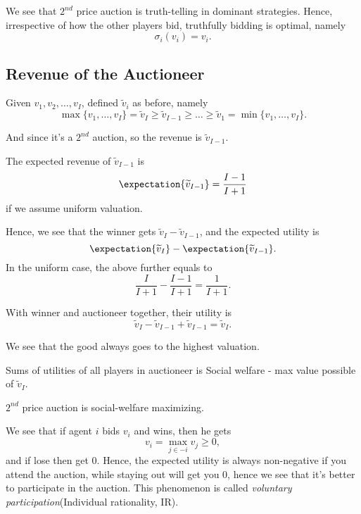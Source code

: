 \begin{remark}
	We see that \(2^{nd}\) price auction is truth-telling in dominant strategies. Hence, irrespective of how the other players bid, truthfully bidding is optimal, namely
	\[
		\sigma_{i}(v_{i}) = v_{i}.
	\]
\end{remark}
\subsection{Revenue of the Auctioneer}
Given \(v_1, v_2, \ldots , v_I\), defined \(\widetilde{v}_i\) as before, namely
\[
	\max\{v_1, \ldots , v_I\} = \widetilde{v}_{I}\geq \widetilde{v}_{I-1}\geq \ldots \geq \widetilde{v}_1 = \min\{v_1, \ldots , v_I\}.
\]

And since it's a \(2^{nd}\) auction, so the revenue is \(\widetilde{v}_{I - 1}\).

\begin{note}
	The expected revenue of \(\widetilde{v}_{I - 1}\) is
	\[
		\expectation{\widetilde{v}_{I-1}} = \frac{I-1}{I+1}
	\]
	if we assume uniform valuation.
\end{note}

Hence, we see that the winner gets \(\widetilde{v}_{I} - \widetilde{v}_{I-1}\), and the expected utility is
\[
	\expectation{\widetilde{v}_{I}} - \expectation{\widetilde{v}_{I - 1}}.
\]
In the uniform case, the above further equals to
\[
	\frac{I}{I+1} - \frac{I - 1}{I + 1} = \frac{1}{I+1}.
\]

With winner and auctioneer together, their utility is
\[
	\widetilde{v}_{I} - \widetilde{v}_{I - 1}+\widetilde{v}_{I - 1} = \widetilde{v}_{I}.
\]

\begin{remark}
	We see that the good always goes to the highest valuation.
\end{remark}

\hr

Sums of utilities of all players in auctioneer is Social welfare - max value possible of \(\widetilde{v}_{I}\).

\begin{remark}
	\(2^{nd}\) price auction is social-welfare maximizing.
\end{remark}

We see that if agent \(i\) bids \(v_{i}\) and wins, then he gets
\[
	v_{i} = \max_{j\in -i} v_{j}\geq 0,
\]
and if lose then get \(0\). Hence, the expected utility is always non-negative if you attend the auction, while staying out will get you \(0\), hence
we see that it's better to participate in the auction. This phenomenon is called \emph{voluntary participation}(Individual rationality, IR).

